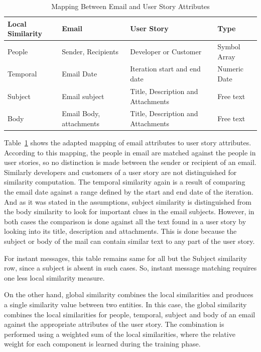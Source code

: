 \begin{table}[at]
  \centering
  \caption{Mapping Between Email and User Story Attributes}
    \begin{tabular}{|p{2.5cm}|p{4cm}|p{5cm}|p{2cm}|}
      \hline
      \textbf{Local Similarity} & \textbf{Email} & \textbf{User Story} & \textbf{Type} \\
      \hline
      People & Sender, Recipients & Developer or Customer & Symbol Array\\      
      \hline
      Temporal & Email Date & Iteration start and end date & Numeric Date \\
      \hline
      Subject & Email subject & Title, Description and Attachments & Free text\\
      \hline
      Body & Email Body, attachments & Title, Description and Attachments & Free text\\
      \hline
    \end{tabular}
	\label{tab:mapping}
\end{table}

Table~\ref{tab:mapping} shows the adapted mapping of email attributes to user story attributes. According to this mapping, the people in email are matched against the people in user stories, so no distinction is made between the sender or recipient of an email. Similarly developers and customers of a user story are not distinguished for similarity computation. The temporal similarity again is a result of comparing the email date against a range defined by the start and end date of the iteration. And as it was stated in the assumptions, subject similarity is distinguished from the body similarity to look for important clues in the email subjects. However, in both cases the comparison is done against all the text found in a user story by looking into its title, description and attachments. This is done because the subject or body of the mail can contain similar text to any part of the user story.

For instant messages, this table remains same for all but the Subject similarity row, since a subject is absent in such cases. So, instant message matching requires one less local similarity measure.

On the other hand, global similarity combines the local similarities and produces a single similarity value between two entities. In this case, the global similarity combines the local similarities for people, temporal, subject and body of an email against the appropriate attributes of the user story. The combination is performed using a weighted sum of the local similarities, where the relative weight for each component is learned during the training phase.

